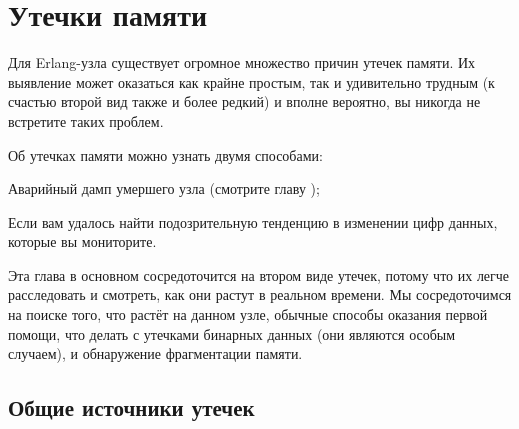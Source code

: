\chapter{Утечки памяти}
\label{chap:memory-leaks}

Для Erlang-узла существует огромное множество причин утечек памяти. Их выявление может оказаться как крайне простым, так и удивительно трудным (к счастью второй вид также и более редкий) и вполне вероятно, вы никогда не встретите таких проблем.

Об утечках памяти можно узнать двумя способами:

\begin{enumerate*}
	\item Аварийный дамп умершего узла (смотрите главу );
	\item Если вам удалось найти подозрительную тенденцию в изменении цифр данных, которые вы мониторите.
\end{enumerate*}

Эта глава в основном сосредоточится на втором виде утечек, потому что их легче расследовать и смотреть, как они растут в реальном времени. Мы сосредоточимся на поиске того, что растёт на данном узле, обычные способы оказания первой помощи, что делать с утечками бинарных данных (они являются особым случаем), и обнаружение фрагментации памяти.


\section{Общие источники утечек}

